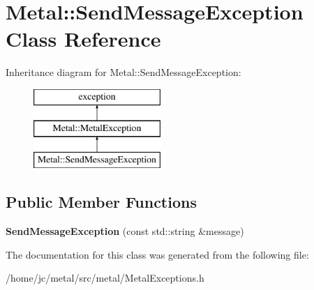 \hypertarget{classMetal_1_1SendMessageException}{}\section{Metal\+:\+:Send\+Message\+Exception Class Reference}
\label{classMetal_1_1SendMessageException}
Inheritance diagram for Metal\+:\+:Send\+Message\+Exception\+:\begin{figure}[H]
\begin{center}
\leavevmode
\includegraphics[height=3.000000cm]{classMetal_1_1SendMessageException}
\end{center}
\end{figure}
\subsection*{Public Member Functions}
\begin{DoxyCompactItemize}
\item 
\hypertarget{classMetal_1_1SendMessageException_a4aeb690808ab3639bbd837b7c57cc419}{}{\bfseries Send\+Message\+Exception} (const std\+::string \&message)\label{classMetal_1_1SendMessageException_a4aeb690808ab3639bbd837b7c57cc419}

\end{DoxyCompactItemize}


The documentation for this class was generated from the following file\+:\begin{DoxyCompactItemize}
\item 
/home/jc/metal/src/metal/Metal\+Exceptions.\+h\end{DoxyCompactItemize}
